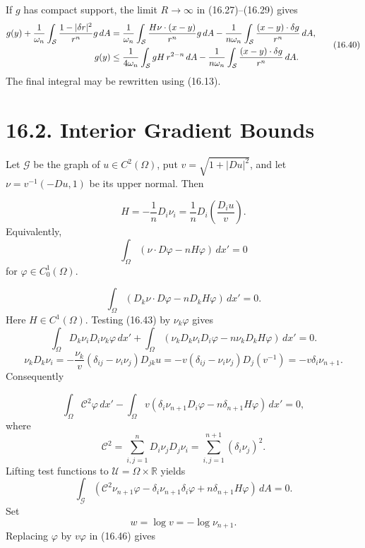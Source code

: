 \begin{remark}\label{gilbarg-trudinger.remark.compact-support-potential}
If $g$ has compact support, the limit $R\to\infty$ in (16.27)--(16.29)
gives
\begin{equation}
\begin{aligned}
g(y)+\frac1{\omega_n}\int_\mathcal S
\frac{1-|\delta r|^2}{r^n}g\,dA
&=\frac1{\omega_n}\int_\mathcal S
\frac{H\nu\cdot(x-y)}{r^n}g\,dA
-\frac1{n\omega_n}\int_\mathcal S\frac{(x-y)\cdot\delta g}{r^n}\,dA,\\
g(y)&\le\frac1{4\omega_n}\int_\mathcal SgH\,r^{2-n}\,dA
-\frac1{n\omega_n}\int_\mathcal S\frac{(x-y)\cdot\delta g}{r^n}\,dA.
\end{aligned}
\tag{16.40}
\end{equation}
The final integral may be rewritten using (16.13).
\end{remark}

\section*{16.2. Interior Gradient Bounds}

Let $\mathcal G$ be the graph of $u\in C^2(\Omega)$, put
$v=\sqrt{1+|Du|^2}$, and let $\nu=v^{-1}(-Du,1)$ be its upper normal.
Then

\[
\tag{16.41}
H=-\frac1nD_i\nu_i
=\frac1nD_i\!\left(\frac{D_iu}{v}\right).
\]
Equivalently,
\[
\tag{16.42}
\int_\Omega(\nu\cdot D\varphi-nH\varphi)\,dx'=0
\]
for $\varphi\in C_0^1(\Omega)$.

\[
\tag{16.43}
\int_\Omega(D_k\nu\cdot D\varphi-nD_kH\varphi)\,dx'=0.
\]
Here $H\in C^1(\Omega)$.  Testing (16.43) by $\nu_k\varphi$ gives
\[
\tag{16.44}
\int_\Omega D_k\nu_iD_i\nu_k\varphi\,dx'
+\int_\Omega(\nu_kD_k\nu_iD_i\varphi
-n\nu_kD_kH\varphi)\,dx'=0.
\]
\[
\nu_kD_k\nu_i=-\frac{\nu_k}{v}(\delta_{ij}-\nu_i\nu_j)D_{jk}u
=-v(\delta_{ij}-\nu_i\nu_j)D_j(v^{-1})
=-v\delta_i\nu_{n+1}.
\]
Consequently

\[
\tag{16.45}
\int_\Omega\mathcal C^2\varphi\,dx'
-\int_\Omega v(\delta_i\nu_{n+1}D_i\varphi
-n\delta_{n+1}H\varphi)\,dx'=0,
\]
where
\[
\mathcal C^2=\sum_{i,j=1}^nD_i\nu_jD_j\nu_i
=\sum_{i,j=1}^{n+1}(\delta_i\nu_j)^2.
\]
Lifting test functions to $\mathcal U=\Omega\times\mathbb R$ yields
\[
\tag{16.46}
\int_\mathcal G(\mathcal C^2\nu_{n+1}\varphi
-\delta_i\nu_{n+1}\delta_i\varphi
+n\delta_{n+1}H\varphi)\,dA=0.
\]
Set
\[
\tag{16.47}
w=\log v=-\log\nu_{n+1}.
\]
Replacing $\varphi$ by $v\varphi$ in (16.46) gives

